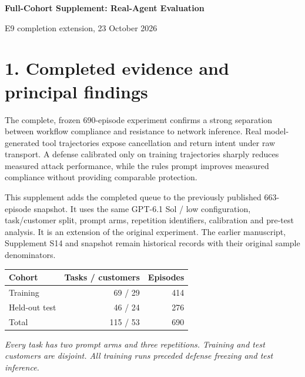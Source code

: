 \documentclass[10pt,letterpaper]{article}
\begin{document}
\begin{center}
{\LARGE\bfseries Full-Cohort Supplement: Real-Agent Evaluation}\par\medskip
{\large E9 completion extension, 23 October 2026}\par
\end{center}
\section*{1. Completed evidence and principal findings}
The complete, frozen 690-episode experiment confirms a strong separation between workflow compliance and resistance to network inference. Real model-generated tool trajectories expose cancellation and return intent under raw transport. A defense calibrated only on training trajectories sharply reduces measured attack performance, while the rules prompt improves measured compliance without providing comparable protection.

This supplement adds the completed queue to the previously published 663-episode snapshot. It uses the same GPT-6.1 Sol / low configuration, task/customer split, prompt arms, repetition identifiers, calibration and pre-test analysis. It is an extension of the original experiment. The earlier manuscript, Supplement S14 and snapshot remain historical records with their original sample denominators.


\begin{center}\small
\begin{tabular}{@{}lrr@{}}\toprule
Cohort & Tasks / customers & Episodes\\\midrule
Training & 69 / 29 & 414\\
Held-out test & 46 / 24 & 276\\
Total & 115 / 53 & 690\\
\bottomrule\end{tabular}
\end{center}
\noindent\textit{Every task has two prompt arms and three repetitions. Training and test customers are disjoint. All training runs preceded defense freezing and test inference.}
\par\medskip
\end{document}
